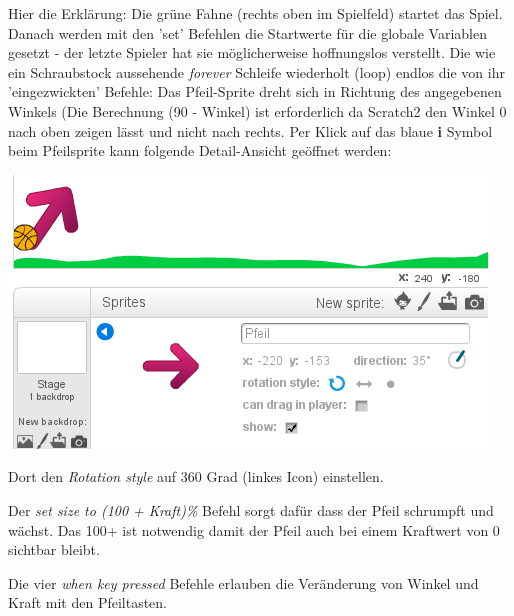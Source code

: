 \documentclass[10pt,a4paper,ngerman,twoside]{article} %
\begin{document}
\begin{multicols}{3}
Hier die Erklärung: Die grüne Fahne (rechts oben im Spielfeld) startet das Spiel. Danach werden mit den 'set' Befehlen die Startwerte für die globale Variablen gesetzt - der letzte Spieler hat sie möglicherweise hoffnungslos verstellt. Die wie ein Schraubstock aussehende \textit{forever} Schleife wiederholt (loop) endlos die von ihr 'eingezwickten' Befehle: Das Pfeil-Sprite dreht sich in Richtung des angegebenen Winkels (Die Berechnung (90 - Winkel) ist erforderlich da Scratch2 den Winkel 0 nach oben zeigen lässt und nicht nach rechts. Per Klick auf das blaue \textbf{i} Symbol beim Pfeilsprite kann folgende Detail-Ansicht geöffnet werden: 

\begin{center}
\includegraphics[width=\linewidth]{scratch/farrow.png}
\end{center}

Dort den \textit{Rotation style} auf 360 Grad (linkes Icon) einstellen.

Der \textit{set size to (100 + Kraft)\%} Befehl sorgt dafür dass der Pfeil schrumpft und wächst. Das 100+ ist notwendig damit der Pfeil auch bei einem Kraftwert von 0 sichtbar bleibt.

Die vier \textit{when key pressed} Befehle erlauben die Veränderung von Winkel und Kraft mit den Pfeiltasten.


\end{multicols}
\end{document}
